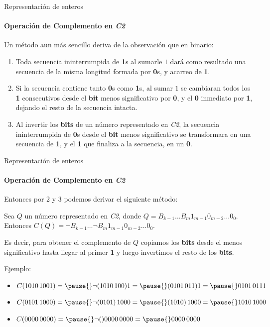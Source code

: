 \documentclass[11pt,a4paper,spanish]{beamer}
\newcommand{\burbuja}[1]{{\textcircled{\small{#1}}}}
\begin{document}
\begin{frame}{Representación de enteros}
    \framesubtitle{Operación de Complemento en \emph{C2}}

    Un método aun más sencillo deriva de la observación que en binario:

    \begin{enumerate}
        \item Toda secuencia ininterrumpida de \textbf{1}s al sumarle
            \(1\) dará como resultado una secuencia de la misma longitud
            formada por \textbf{0}s, y acarreo de \textbf{1}. \pause
        \item Si la secuencia contiene tanto \textbf{0}s como \textbf{1}s, al
            sumar \(1\) se cambiaran todos los \textbf{1} consecutivos desde
            el \textbf{bit} menos significativo por \textbf{0}, y el
            \textbf{0} inmediato por \textbf{1}, dejando el resto de la
            secuencia intacta. \pause
        \item Al invertir los \textbf{bits} de un número representado en
            \emph{C2}, la secuencia ininterrumpida de \textbf{0}s desde el
            \textbf{bit} menos significativo se transformara en una secuencia
            de \textbf{1}, y el \textbf{1} que finaliza a la secuencia, en un
            \textbf{0}.
    \end{enumerate}

\end{frame}


\begin{frame}{Representación de enteros}
    \framesubtitle{Operación de Complemento en \emph{C2}}
    
    Entonces por \burbuja{2} y \burbuja{3} podemos derivar el siguiente
    método:

    Sea \(Q\) un número representado en \emph{C2}, donde
    \(Q=B_{k-1}\ldots{}B_{m}1_{m-1}0_{m-2}\ldots{}0_{0}\).\pause
    Entonces
    \(C(Q)=\neg{}B_{k-1}\ldots{}\neg{}B_{m}1_{m-1}0_{m-2}\ldots{}0_{0}\).
    \pause

    Es decir, para obtener el complemento de \(Q\) copiamos los \textbf{bits}
    desde el menos significativo hasta llegar al primer \textbf{1} y luego
    invertimos el resto de los \textbf{bits}. \pause

    Ejemplo:

    \begin{itemize}
        \item \(C(1010\,1001) =\pause{} \neg(1010\,100)1 =\pause{}
            (0101\,011)1 =\pause{} 0101\,0111\)\pause
        \item \(C(0101\,1000) =\pause{} \neg(0101)\,1000 =\pause{}
            (1010)\,1000 =\pause{} 1010\,1000\)\pause
        \item \(C(0000\,0000) =\pause{} \neg()0000\,0000 =\pause{}
            0000\,0000\)
    \end{itemize}

\end{frame}
\end{document}
